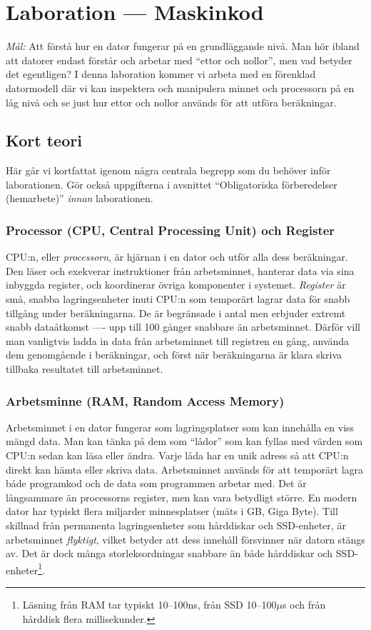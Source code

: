 
\section{Laboration  --- Maskinkod}

\emph{Mål:} Att förstå hur en dator fungerar på en grundläggande nivå. Man hör ibland att datorer endast förstår och arbetar med ``ettor och nollor'', men vad betyder det egentligen? I denna laboration kommer vi arbeta med en förenklad datormodell där vi kan inspektera och manipulera minnet och processorn på en låg nivå och se just hur ettor och nollor används för att utföra beräkningar.

\subsection{Kort teori}
Här går vi kortfattat igenom några centrala begrepp som du behöver inför laborationen. Gör också uppgifterna i avsnittet ``Obligatoriska förberedelser (hemarbete)'' \emph{innan} laborationen.

\subsubsection{Processor (CPU, Central Processing Unit) och Register}
CPU:n, eller \emph{processorn}, är hjärnan i en dator och utför alla dess beräkningar. Den läser och exekverar instruktioner från arbetsminnet, hanterar data via sina inbyggda register, och koordinerar övriga komponenter i systemet. \emph{Register} är små, snabba lagringsenheter inuti CPU:n som temporärt lagrar data för snabb tillgång under beräkningarna. De är begränsade i antal men erbjuder extremt snabb dataåtkomst —- upp till 100 gånger snabbare än arbetsminnet. Därför vill man vanligtvis ladda in data från arbetsminnet till registren en gång, använda dem genomgående i beräkningar, och först när beräkningarna är klara skriva tillbaka resultatet till arbetsminnet.

\subsubsection{Arbetsminne (RAM, Random Access Memory)}
Arbetsminnet i en dator fungerar som lagringsplatser som kan innehålla en viss mängd data. Man kan tänka på dem som ``lådor'' som kan fyllas med värden som CPU:n sedan kan läsa eller ändra. Varje låda har en unik adress så att CPU:n direkt kan hämta eller skriva data.
Arbetsminnet används för att temporärt lagra både programkod och de data som programmen arbetar med.
Det är långsammare än processorns register, men kan vara betydligt större. En modern dator har typiskt flera miljarder minnesplatser (mäts i GB, Giga Byte). 
Till skillnad från permanenta lagringsenheter som hårddiskar och SSD-enheter, är arbetsminnet \emph{flyktigt}, vilket betyder att dess innehåll försvinner när datorn stängs av. Det är dock många storleksordningar snabbare än både hårddiskar och SSD-enheter\footnote{Läsning från RAM tar typiskt 10--100ns, från SSD 10--100$\mu$s och från hårddisk flera millisekunder.}.


